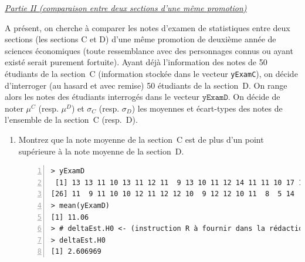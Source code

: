 \documentclass[10pt]{report}
\begin{document}
\begin{exercice}
\noindent \underline{\textit{Partie II (comparaison entre deux sections d'une m{\^e}me promotion)}}

A pr{\'e}sent, on cherche {\`a} comparer les notes d'examen de statistiques entre deux sections (les sections C et D) d'une m{\^e}me promotion de deuxi{\`e}me ann{\'e}e de sciences {\'e}conomiques (toute ressemblance avec des personnages connus ou ayant exist{\'e} serait purement fortuite). Ayant d{\'e}j{\`a} l'information des notes de 50 {\'e}tudiants de la section~C (information stock{\'e}e dans le vecteur \texttt{yExamC}), on d{\'e}cide d'interroger (au hasard et avec remise) 50 {\'e}tudiants de la section~D. On range alors les notes des {\'e}tudiants interrog{\'e}s dans le vecteur $\texttt{yExamD}$. On d{\'e}cide de noter $\mu^C$ (resp. $\mu^D$) et $\sigma_C$ (resp. $\sigma_D$) les moyennes et {\'e}cart-types des notes de l'ensemble de la section~C (resp.~D).\\

\begin{enumerate}
\item Montrez que la note moyenne de la section~C est de plus d'un point sup{\'e}rieure {\`a} la note moyenne de la section~D.

\IndicR
\begin{Verbatim}[frame=leftline,fontfamily=tt,fontshape=n,numbers=left]
> yExamD
 [1] 13 13 11 10 13 11 12 11  9 13 10 11 12 14 11 11 10 17 10  7 17 11  9 10 14
[26] 11  9 11 10 10 12 11 12 12 10  9 12 12 10 11  8  5 14  9 12 11 11  9 11 11
> mean(yExamD)
[1] 11.06
> # deltaEst.H0 <- (instruction R à fournir dans la rédaction)
> deltaEst.H0
[1] 2.606969
\end{Verbatim}

 


\end{enumerate}
\end{exercice}
\end{document}
